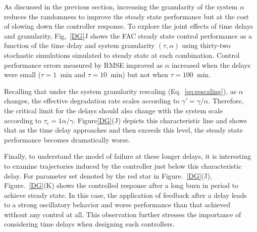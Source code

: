\documentclass[12pt]{iopart}
\begin{document}
As discussed in the previous section, increasing the granularity of the system $\alpha$ reduces the randomness to improve the steady state performance but at the cost of slowing down the controller response.  To explore the joint effects of time delays and granularity, Fig,\ \ref{DG}J shows the FAC steady state control performance as a function of the time delay and system granularity $(\tau,\alpha)$ using thirty-two stochastic simulations simulated to steady state at each combination. Control performance errors measured by RMSE improved as $\alpha$ increased when the delays were small ($\tau=1 \ $ min and $\tau=10 \ $ min) but not when $\tau=100 \ $ min. 
%

Recalling that under the system granularity rescaling (Eq.\ \ref{eq:rescaling}), as $\alpha$ changes, the effective degradation rate scales according to $\gamma' = \gamma/\alpha$.  Therefore, the critical limit for the delays should also change with the system scale according to $\tau_c = 1\alpha/\gamma$. Figure\ref{DG}(J) depicts this characteristic line and shows that as the time delay approaches and then exceeds this level, the steady state performance becomes dramatically worse. 

Finally, to understand the model of failure at these longer delays, it is interesting to examine trajectories induced by the controller just below this characteristic delay. For parameter set denoted by the red star in Figure.\ \ref {DG}(J), Figure.\ \ref {DG}(K) shows the controlled response after a long burn in period to achieve steady state. In this case, the application of feedback after a delay leads to a strong oscillatory behavior and worse performance than that achieved without any control at all. This observation further stresses the importance of considering time delays when designing such controllers.
\end{document}
